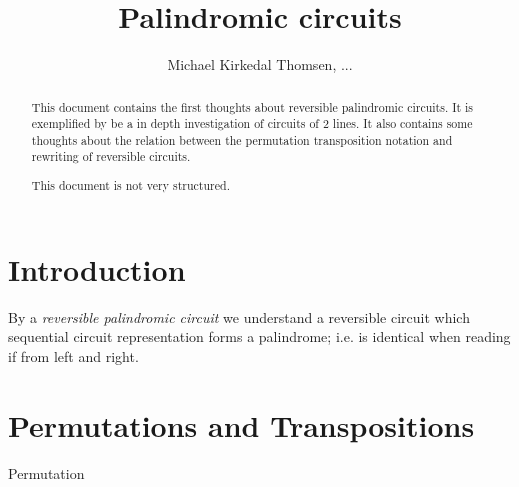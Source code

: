 \documentclass{llncs}
\begin{document}
\mainmatter              %

%
\title{Palindromic circuits}
%
%
\author{Michael Kirkedal Thomsen, ...}
%
%
%

\maketitle              %

\begin{abstract}
This document contains the first thoughts about reversible palindromic circuits. It is exemplified by be a in depth investigation of circuits of 2 lines. It also contains some thoughts about the relation between the permutation transposition notation and rewriting of reversible circuits.

This document is not very structured.

\keywords{}
\end{abstract}
%
\section{Introduction}
By a \emph{reversible palindromic circuit} we understand a reversible circuit which sequential circuit representation forms a palindrome; i.e. is identical when reading if from left and right. 

%
\section{Permutations and Transpositions}
\begin{definition}
Permutation
\end{definition}
\end{document}
